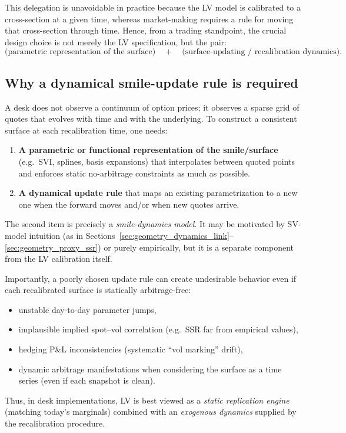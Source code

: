 \documentclass[11pt,a4paper]{report}
\begin{document}
This delegation is unavoidable in practice because the LV model is calibrated to a cross-section at a given time, whereas market-making requires a rule for moving that cross-section through time.
Hence, from a trading standpoint, the crucial design choice is not merely the LV specification, but the pair:
\begin{equation}
\Big(\text{parametric representation of the surface}\Big)
\quad + \quad
\Big(\text{surface-updating / recalibration dynamics}\Big).
\end{equation}

\subsection{Why a dynamical smile-update rule is required}
A desk does not observe a continuum of option prices; it observes a sparse grid of quotes that evolves with time and with the underlying.
To construct a consistent surface at each recalibration time, one needs:
\begin{enumerate}
\item \textbf{A parametric or functional representation of the smile/surface} (e.g.\ SVI, splines, basis expansions) that interpolates between quoted points and enforces static no-arbitrage constraints as much as possible.
\item \textbf{A dynamical update rule} that maps an existing parametrization to a new one when the forward moves and/or when new quotes arrive.
\end{enumerate}
The second item is precisely a \emph{smile-dynamics model}.
It may be motivated by SV-model intuition (as in Sections~\ref{sec:geometry_dynamics_link}--\ref{sec:geometry_proxy_ssr}) or purely empirically, but it is a separate component from the LV calibration itself.

Importantly, a poorly chosen update rule can create undesirable behavior even if each recalibrated surface is statically arbitrage-free:
\begin{itemize}
\item unstable day-to-day parameter jumps,
\item implausible implied spot--vol correlation (e.g.\ SSR far from empirical values),
\item hedging P\&L inconsistencies (systematic ``vol marking'' drift),
\item dynamic arbitrage manifestations when considering the surface as a time series (even if each snapshot is clean).
\end{itemize}
Thus, in desk implementations, LV is best viewed as a \emph{static replication engine} (matching today’s marginals) combined with an \emph{exogenous dynamics} supplied by the recalibration procedure.
\end{document}
